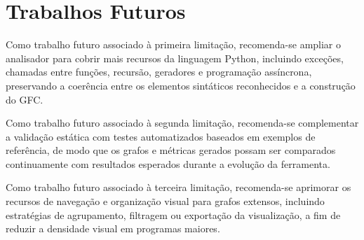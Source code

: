 \section{Trabalhos Futuros}

Como trabalho futuro associado à primeira limitação, recomenda-se ampliar o analisador para cobrir mais recursos da linguagem Python, incluindo exceções, chamadas entre funções, recursão, geradores e programação assíncrona, preservando a coerência entre os elementos sintáticos reconhecidos e a construção do GFC.

Como trabalho futuro associado à segunda limitação, recomenda-se complementar a validação estática com testes automatizados baseados em exemplos de referência, de modo que os grafos e métricas gerados possam ser comparados continuamente com resultados esperados durante a evolução da ferramenta.

Como trabalho futuro associado à terceira limitação, recomenda-se aprimorar os recursos de navegação e organização visual para grafos extensos, incluindo estratégias de agrupamento, filtragem ou exportação da visualização, a fim de reduzir a densidade visual em programas maiores.
